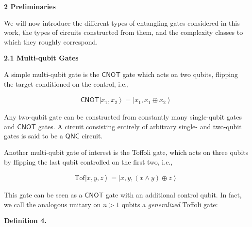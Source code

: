 \documentclass[10pt,a4paper]{article}
\begin{document}
\par\medskip\noindent\textbf{
2 Preliminaries}\par




We will now introduce the different types of entangling gates considered in this work, the types of circuits constructed from them, and the complexity classes to which they roughly correspond.\par




\par\medskip\noindent\textbf{
2.1 Multi-qubit Gates}\par




A simple multi-qubit gate is the $\mathsf{CNOT}$ gate which acts on two qubits, flipping the target conditioned on the control, i.e.,\par


\[\begin{gathered}
\displaystyle\mathsf{CNOT}\left|x_{1},x_{2}\right\rangle=\left|x_{1},x_{1}\oplus x_{2}\right\rangle
\end{gathered}\]


Any two-qubit gate can be constructed from constantly many single-qubit gates and $\mathsf{CNOT}$ gates. A circuit consisting entirely of arbitrary single- and two-qubit gates is said to be a ${\mathsf{QNC}}$ circuit.\par




Another multi-qubit gate of interest is the Toffoli gate, which acts on three qubits by flipping the last qubit controlled on the first two, i.e.,\par


\[\begin{gathered}
\displaystyle\text{Tof}\left|x,y,z\right\rangle=\left|x,y,(x\land y)\oplus z\right\rangle
\end{gathered}\]


This gate can be seen as a $\mathsf{CNOT}$ gate with an additional control qubit. In fact, we call the analogous unitary on $n>1$ qubits a \emph{generalized} Toffoli gate:\par





\par\medskip\noindent\textbf{
\textbf{Definition 4}\textbf{.}
}\par
\end{document}
